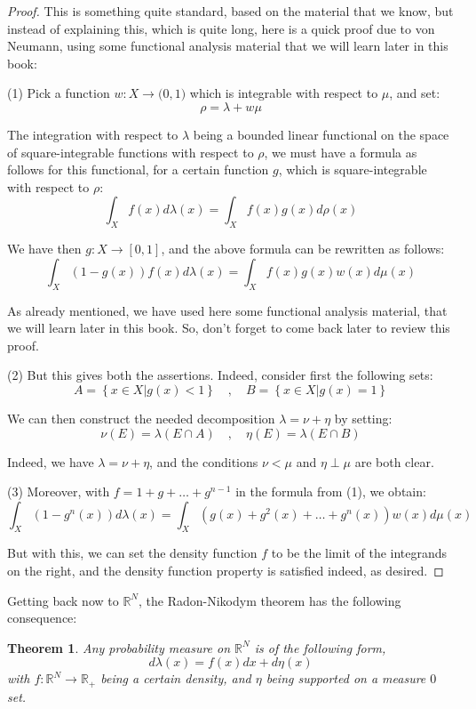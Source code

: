 \documentclass[12pt]{amsbook}
\newtheorem{theorem}{Theorem}[chapter]
\begin{document}
\begin{proof}
This is something quite standard, based on the material that we know, but instead of explaining this, which is quite long, here is a quick proof due to von Neumann, using some functional analysis material that we will learn later in this book:

\medskip

(1) Pick a function $w:X\to\mathbb(0,1)$ which is integrable with respect to $\mu$, and set:
$$\rho=\lambda+w\mu$$

The integration with respect to $\lambda$ being a bounded linear functional on the space of square-integrable functions with respect to $\rho$, we must have a formula as follows for this functional, for a certain function $g$, which is square-integrable with respect to $\rho$:
$$\int_Xf(x)d\lambda(x)=\int_Xf(x)g(x)d\rho(x)$$

We have then $g:X\to[0,1]$, and the above formula can be rewritten as follows:
$$\int_X(1-g(x))f(x)d\lambda(x)=\int_Xf(x)g(x)w(x)d\mu(x)$$

As already mentioned, we have used here some functional analysis material, that we will learn later in this book. So, don't forget to come back later to review this proof.

\medskip

(2) But this gives both the assertions. Indeed, consider first the following sets:
$$A=\left\{x\in X\Big|g(x)<1\right\}\quad,\quad B=\left\{x\in X\Big|g(x)=1\right\}$$ 

We can then construct the needed decomposition $\lambda=\nu+\eta$ by setting:
$$\nu(E)=\lambda(E\cap A)\quad,\quad\eta(E)=\lambda(E\cap B)$$

Indeed, we have $\lambda=\nu+\eta$, and the conditions $\nu<\mu$ and $\eta\perp\mu$ are both clear.

\medskip

(3) Moreover, with $f=1+g+\ldots+g^{n-1}$ in the formula from (1), we obtain:
$$\int_X(1-g^n(x))d\lambda(x)=\int_X(g(x)+g^2(x)+\ldots+g^n(x))w(x)d\mu(x)$$

But with this, we can set the density function $f$ to be the limit of the integrands on the right, and the density function property is satisfied indeed, as desired.
\end{proof}

Getting back now to $\mathbb R^N$, the Radon-Nikodym theorem has the following consequence:

\begin{theorem}
Any probability measure on $\mathbb R^N$ is of the following form,
$$d\lambda(x)=f(x)dx+d\eta(x)$$
with $f:\mathbb R^N\to\mathbb R_+$ being a certain density, and $\eta$ being supported on a measure $0$ set.
\end{theorem}
\end{document}
